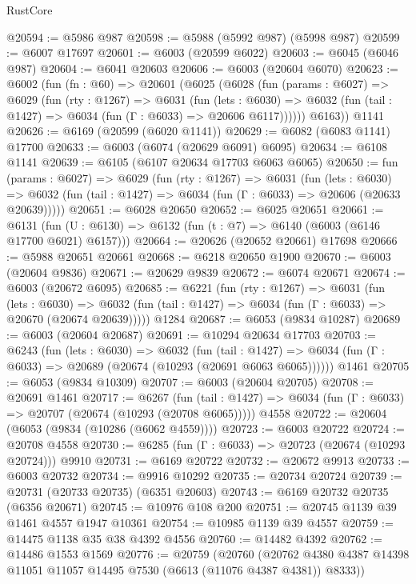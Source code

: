 \begin{lexlean}{RustCore}
\begin{coremodule}
@20594 := @5986 @987
@20598 := @5988 (@5992 @987) (@5998 @987)
@20599 := @6007 @17697
@20601 := @6003 (@20599 @6022)
@20603 := @6045 (@6046 @987)
@20604 := @6041 @20603
@20606 := @6003 (@20604 @6070)
@20623 := @6002
    (fun (fn : @60) =>
    @20601
      (@6025
        (@6028
          (fun (params : @6027) =>
          @6029
            (fun (rty : @1267) =>
            @6031
              (fun (lets : @6030) =>
              @6032 (fun (tail : @1427) => @6034 (fun (Γ : @6033) => @20606 @6117))))))
        @6163))
    @1141
@20626 := @6169 (@20599 (@6020 @1141))
@20629 := @6082 (@6083 @1141) @17700
@20633 := @6003 (@6074 (@20629 @6091) @6095)
@20634 := @6108 @1141
@20639 := @6105 (@6107 @20634 @17703 @6063 @6065)
@20650 := fun (params : @6027) =>
  @6029
    (fun (rty : @1267) =>
    @6031
      (fun (lets : @6030) =>
      @6032 (fun (tail : @1427) => @6034 (fun (Γ : @6033) => @20606 (@20633 @20639)))))
@20651 := @6028 @20650
@20652 := @6025 @20651
@20661 := @6131
    (fun (U : @6130) => @6132 (fun (t : @7) => @6140 (@6003 (@6146 @17700 @6021) @6157)))
@20664 := @20626 (@20652 @20661) @17698
@20666 := @5988 @20651 @20661
@20668 := @6218 @20650 @1900
@20670 := @6003 (@20604 @9836)
@20671 := @20629 @9839
@20672 := @6074 @20671
@20674 := @6003 (@20672 @6095)
@20685 := @6221
    (fun (rty : @1267) =>
    @6031
      (fun (lets : @6030) =>
      @6032 (fun (tail : @1427) => @6034 (fun (Γ : @6033) => @20670 (@20674 @20639)))))
    @1284
@20687 := @6053 (@9834 @10287)
@20689 := @6003 (@20604 @20687)
@20691 := @10294 @20634 @17703
@20703 := @6243
    (fun (lets : @6030) =>
    @6032
      (fun (tail : @1427) =>
      @6034 (fun (Γ : @6033) => @20689 (@20674 (@10293 (@20691 @6063 @6065))))))
    @1461
@20705 := @6053 (@9834 @10309)
@20707 := @6003 (@20604 @20705)
@20708 := @20691 @1461
@20717 := @6267
    (fun (tail : @1427) => @6034 (fun (Γ : @6033) => @20707 (@20674 (@10293 (@20708 @6065)))))
    @4558
@20722 := @20604 (@6053 (@9834 (@10286 (@6062 @4559))))
@20723 := @6003 @20722
@20724 := @20708 @4558
@20730 := @6285 (fun (Γ : @6033) => @20723 (@20674 (@10293 @20724))) @9910
@20731 := @6169 @20722
@20732 := @20672 @9913
@20733 := @6003 @20732
@20734 := @9916 @10292
@20735 := @20734 @20724
@20739 := @20731 (@20733 @20735) (@6351 @20603)
@20743 := @6169 @20732 @20735 (@6356 @20671)
@20745 := @10976 @108 @200
@20751 := @20745 @1139 @39 @1461 @4557 @1947 @10361
@20754 := @10985 @1139 @39 @4557
@20759 := @14475 @1138 @35 @38 @4392 @4556
@20760 := @14482 @4392
@20762 := @14486 @1553 @1569
@20776 := @20759
    (@20760
      (@20762 @4380 @4387 @14398 @11051 @11057 @14495 @7530 (@6613 (@11076 @4387 @4381)) @8333))

\end{coremodule}
\end{lexlean}
